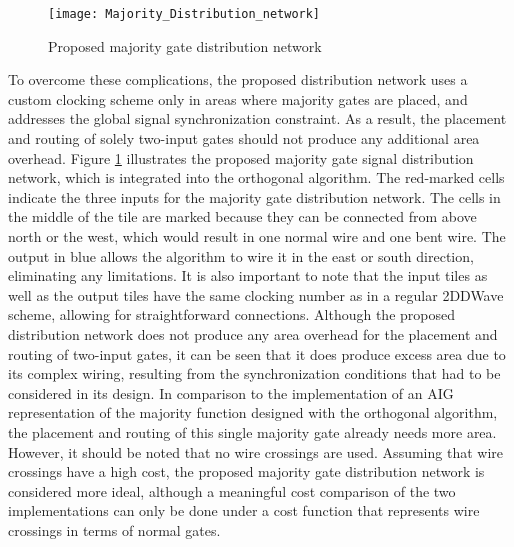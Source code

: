 
\begin{figure}
	\centering
	\texttt{[image: Majority\_Distribution\_network]}
	\caption{Proposed majority gate distribution network}\label{fig:QCA_Maj_nw}
\end{figure}


To overcome these complications, the proposed distribution network uses a custom clocking scheme only in areas where majority gates are placed, and addresses the global signal synchronization constraint. As a result, the placement and routing of solely two-input gates should not produce any additional area overhead. Figure \ref{fig:QCA_Maj_nw} illustrates the proposed majority gate signal distribution network, which is integrated into the orthogonal algorithm. The red-marked cells indicate the three inputs for the majority gate distribution network. The cells in the middle of the tile are marked because they can be connected from above north or the west, which would result in one normal wire and one bent wire. The output in blue allows the algorithm to wire it in the east or south direction, eliminating any limitations. It is also important to note that the input tiles as well as the output tiles have the same clocking number as in a regular 2DDWave scheme, allowing for straightforward connections. Although the proposed distribution network does not produce any area overhead for the placement and routing of two-input gates, it can be seen that it does produce excess area due to its complex wiring, resulting from the synchronization conditions that had to be considered in its design. In comparison to the implementation of an AIG representation of the majority function designed with the orthogonal algorithm, the placement and routing of this single majority gate already needs more area. However, it should be noted that no wire crossings are used. Assuming that wire crossings have a high cost, the proposed majority gate distribution network is considered more ideal, although a meaningful cost comparison of the two implementations can only be done under a cost function that represents wire crossings in terms of normal gates.


